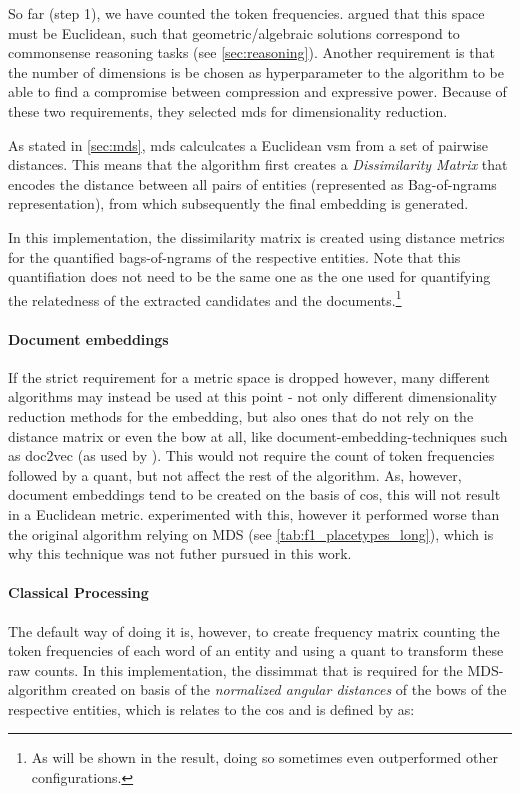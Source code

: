 So far (step 1), we have counted the token frequencies. \textcite{Derrac2015} argued that this space must be Euclidean, such that geometric/algebraic solutions correspond to commonsense reasoning tasks (see \autoref{sec:reasoning}). Another requirement is that the number of dimensions is be chosen as hyperparameter to the algorithm to be able to find a compromise between compression and expressive power. Because of these two requirements, they selected \gls{mds} for dimensionality reduction.

As stated in \autoref{sec:mds}, \gls{mds} calculcates a Euclidean \gls{vsm} from a set of pairwise distances. This means that the algorithm first creates a \textit{Dissimilarity Matrix} that encodes the distance between all pairs of entities (represented as Bag-of-ngrams representation), from which subsequently the final embedding is generated. 

In this implementation, the dissimilarity matrix is created using distance metrics for the quantified bags-of-ngrams of the respective entities. Note that this quantifiation does not need to be the same one as the one used for quantifying the relatedness of the extracted candidates and the documents.\footnote{As will be shown in the result, doing so sometimes even outperformed other configurations.}

\paragraph{Document embeddings}
If the strict requirement for a metric space is dropped however, many different algorithms may instead be used at this point - not only different dimensionality reduction methods for the embedding, but also ones that do not rely on the distance matrix or even the \gls{bow} at all, like document-embedding-techniques such as \gls{doc2vec} \cite{Le2014} (as \eg used by \cite{Alshaikh2020}). This would not require the count of token frequencies followed by a \gls{quant}, but not affect the rest of the algorithm. As, however, document embeddings tend to be created on the basis of \gls{cos}, this will not result in a Euclidean metric. \textcite{Alshaikh2020} experimented with this, however it performed worse than the original algorithm relying on MDS (see \autoref{tab:f1_placetypes_long}), which is why this technique was not futher pursued in this work.

\paragraph{Classical Processing}
The default way of doing it is, however, to create frequency matrix counting the token frequencies of each word of an entity and using a \gls{quant} to transform these raw counts. In this implementation, the \gls{dissimmat} that is required for the MDS-algorithm created on basis of the \emph{normalized angular distances} of the \glspl{bow} of the respective entities, which is relates to the \gls{cos} and is defined by \textcite{Derrac2015} as:

